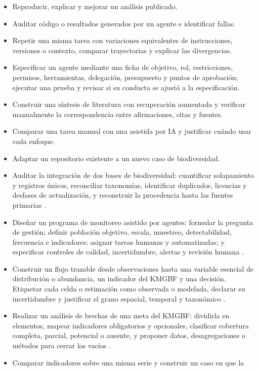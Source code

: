 \documentclass[11pt,a4paper]{article}
\begin{document}
\begin{itemize}
  \item Reproducir, explicar y mejorar un análisis publicado.
  \item Auditar código o resultados generados por un agente e identificar fallas.
  \item Repetir una misma tarea con variaciones equivalentes de instrucciones,
  versiones o contexto, comparar trayectorias y explicar las divergencias.
  \item Especificar un agente mediante una ficha de objetivo, rol, restricciones,
  permisos, herramientas, delegación, presupuesto y puntos de aprobación; ejecutar
  una prueba y revisar si su conducta se ajustó a la especificación.
  \item Construir una síntesis de literatura con recuperación aumentada y verificar
  manualmente la correspondencia entre afirmaciones, citas y fuentes.
  \item Comparar una tarea manual con una asistida por IA y justificar cuándo usar
  cada enfoque.
  \item Adaptar un repositorio existente a un nuevo caso de biodiversidad.
  \item Auditar la integración de dos bases de biodiversidad: cuantificar
  solapamiento y registros únicos, reconciliar taxonomías, identificar duplicados,
  licencias y desfases de actualización, y reconstruir la procedencia hasta las
  fuentes primarias \citep{feng2022databases}.
  \item Diseñar un programa de monitoreo asistido por agentes: formular la pregunta
  de gestión; definir población objetivo, escala, muestreo, detectabilidad,
  frecuencia e indicadores; asignar tareas humanas y automatizadas; y especificar
  controles de calidad, incertidumbre, alertas y revisión humana
  \citep{buckland2005monitoring}.
  \item Construir un flujo trazable desde observaciones hasta una variable esencial
  de distribución o abundancia, un indicador del KMGBF y una decisión. Etiquetar
  cada celda o estimación como observada o modelada, declarar su incertidumbre y
  justificar el grano espacial, temporal y taxonómico \citep{jetz2019ebv}.
  \item Realizar un análisis de brechas de una meta del KMGBF: dividirla en
  elementos, mapear indicadores obligatorios y opcionales, clasificar cobertura
  completa, parcial, potencial o ausente, y proponer datos, desagregaciones o
  métodos para cerrar los vacíos \citep{affinito2025coverage}.
  \item Comparar indicadores sobre una misma serie y construir un caso en que la

\end{itemize}
\end{document}
